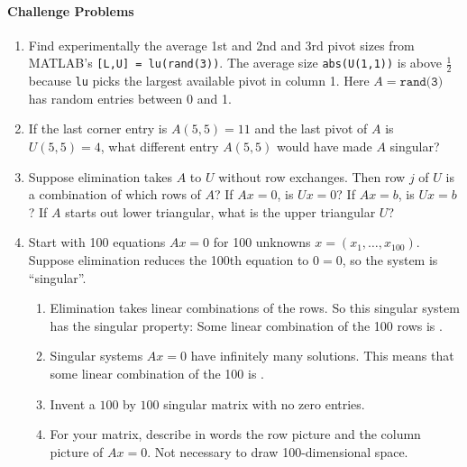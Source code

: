 \documentclass[14pt, a4paper]{article}
\begin{document}
\paragraph{Challenge Problems}

\begin{enumerate}[resume]

    \item Find experimentally the average 1st and 2nd and 3rd pivot sizes from MATLAB's \texttt{[L,U] = lu(rand(3))}. The average size \texttt{abs(U(1,1))} is above $\frac{1}{2}$ because \texttt{lu} picks the largest available pivot in column 1. Here $A = \texttt{rand(3)}$ has random entries between 0 and 1.

    \item If the last corner entry is $A(5,5) = 11$ and the last pivot of $A$ is $U(5,5) = 4$, what different entry $A(5,5)$ would have made $A$ singular?

    \item Suppose elimination takes $A$ to $U$ without row exchanges. Then row $j$ of $U$ is a combination of which rows of $A$? If $Ax = 0$, is $Ux = 0$? If $Ax = b$, is $Ux = b$? If $A$ starts out lower triangular, what is the upper triangular $U$?

    \item Start with 100 equations $Ax = 0$ for 100 unknowns $x = (x_1, \dots, x_{100})$. Suppose elimination reduces the 100th equation to $0 = 0$, so the system is ``singular''.
          \begin{enumerate}
              \item Elimination takes linear combinations of the rows. So this singular system has the singular property: Some linear combination of the 100 rows is \underline{\hspace{3em}}.
              \item Singular systems $Ax = 0$ have infinitely many solutions. This means that some linear combination of the 100 \underline{\hspace{2em}} is \underline{\hspace{3em}}.
              \item Invent a $100$ by $100$ singular matrix with no zero entries.
              \item For your matrix, describe in words the row picture and the column picture of $Ax = 0$. Not necessary to draw 100-dimensional space.
          \end{enumerate}
\end{enumerate}
\end{document}
